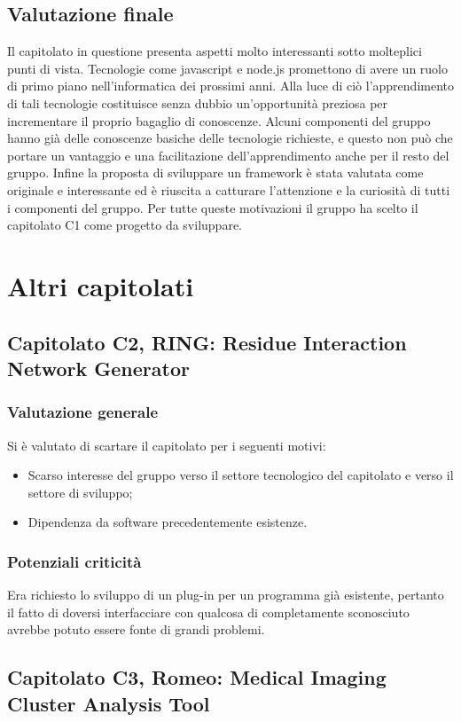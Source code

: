 \subsection{Valutazione finale} 
\label{2.5}
Il capitolato in questione presenta aspetti molto interessanti sotto molteplici punti di vista. Tecnologie come javascript e node.js promettono di avere un ruolo di primo piano nell’informatica dei prossimi anni. Alla luce di ciò l’apprendimento di tali tecnologie costituisce senza dubbio un’opportunità preziosa per incrementare il proprio bagaglio di conoscenze. Alcuni componenti del gruppo hanno già delle conoscenze basiche delle tecnologie richieste, e questo non può che portare un vantaggio e una facilitazione dell’apprendimento anche per il resto del gruppo. Infine la proposta di sviluppare un framework è stata valutata come originale e interessante ed è riuscita a catturare l’attenzione e la curiosità di tutti i componenti del gruppo. Per tutte queste motivazioni il gruppo ha scelto il capitolato C1 come progetto da sviluppare.

\newpage
\section{Altri capitolati}%
\label{3}
\subsection{Capitolato C2, RING: Residue Interaction Network Generator} 
\label{3.1}
\subsubsection{Valutazione generale} 
Si è valutato di scartare il capitolato per i seguenti motivi:
\begin{itemize}
\item Scarso interesse del gruppo verso il settore tecnologico del capitolato e verso il settore di sviluppo;
\item Dipendenza da software precedentemente esistenze.
\end{itemize}
\subsubsection{Potenziali criticità} 
Era richiesto lo sviluppo di un plug-in per un programma già esistente, pertanto il fatto di doversi interfacciare con qualcosa di completamente sconosciuto avrebbe potuto essere fonte di grandi problemi.
\subsection{Capitolato C3,  Romeo: Medical Imaging Cluster Analysis Tool} 
\label{3.2}
